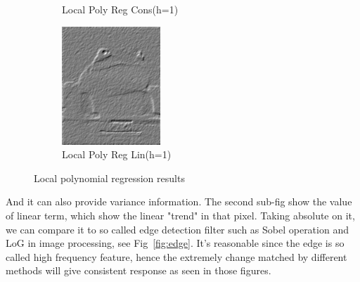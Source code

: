 \documentclass{article}
\begin{document}
\begin{figure}[htb]
\begin{subfigure}[b]{0.24\linewidth}
    \caption{Local Poly Reg Cons(h=1)}
  \end{subfigure}
  \begin{subfigure}[b]{0.24\linewidth}
    \includegraphics[width=\linewidth]{images/poly_nr_lin_true.png}
    \caption{Local Poly Reg Lin(h=1)}
  \end{subfigure}
  \caption{Local polynomial regression results}
  \label{fig:local_poly}
\end{figure}


And it can also provide variance information. The second sub-fig show the value of linear term, which show the linear
"trend" in that pixel. Taking absolute on it, we can compare it to so called edge detection filter such as Sobel operation and LoG
in image processing, see Fig~\ref{fig:edge}. It's reasonable since the edge is so called high frequency feature, hence the extremely
change matched by different methods will give consistent response as seen in those figures.
\end{document}
